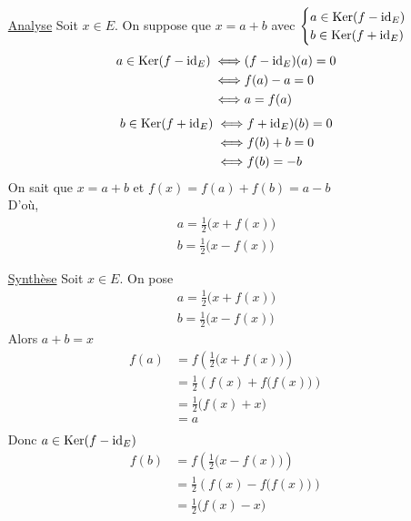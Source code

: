 \begin{prop}
	\begin{itemize}
		\item[\underline{\sc Analyse}] Soit $x \in E$. On suppose que $x = a + b$ avec $\begin{cases}
				a \in \operatorname{Ker}(f - \operatorname{id}_E)\\
				b \in \operatorname{Ker}(f + \operatorname{id}_E)
			\end{cases}$\\
			\begin{align*}
				a \in \operatorname{Ker}(f - \operatorname{id}_E) \iff& (f - \operatorname{id}_E)(a) = 0\\
				\iff& f(a) - a = 0\\
				\iff& a = f(a)
			\end{align*}
			\begin{align*}
				b \in \operatorname{Ker}(f + \operatorname{id}_E) \iff& f+\operatorname{id}_E)(b) = 0\\
				\iff& f(b) + b = 0\\
				\iff& f(b) = -b
			\end{align*}
			On sait que $x = a+b$ et $f(x) = f(a) + f(b) = a - b$ \\
			D'où,
			\begin{align*}
				a = \frac{1}{2}\big(x + f(x)\big)\\
				b = \frac{1}{2} \big(x - f(x)\big)
			\end{align*}
		\item[\underline{\sc Synthèse}] Soit $x \in E$. On pose
			\begin{align*}
				a = \frac{1}{2}\big(x + f(x)\big)\\
				b = \frac{1}{2}\big(x - f(x)\big)
			\end{align*}
			Alors $a+b = x$\\
			\begin{align*}
				f(a) &= f\left( \frac{1}{2}\big(x + f(x)\big) \right)\\
				&=\frac{1}{2}\left( f(x) + f\big(f(x)\big) \right)\\
				&= \frac{1}{2}\big(f(x) + x\big) \\
				&= a \\
			\end{align*}
			Donc $a \in \operatorname{Ker}(f - \operatorname{id}_E)$ 
			\begin{align*}
				f(b) &= f\left( \frac{1}{2}\big(x - f(x)\big) \right)\\
				&= \frac{1}{2}\left( f(x) - f\big(f(x)\big)  \right)  \\
				&= \frac{1}{2}\big(f(x) - x\big) \\

\end{align*}
\end{itemize}
\end{prop}
